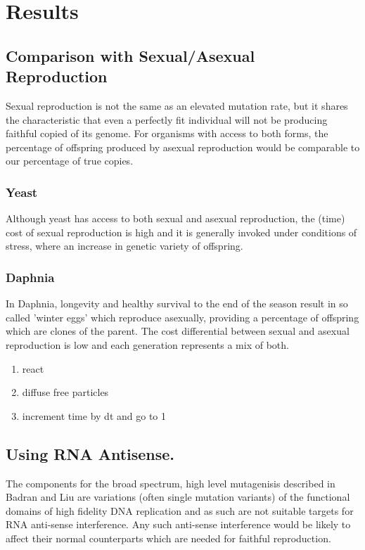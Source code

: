 \documentclass[10pt,letterpaper]{article}
\begin{document}
\section*{Results}

\subsection*{Comparison with Sexual/Asexual Reproduction}
Sexual reproduction is not the same as an elevated mutation rate, but it shares the characteristic that even a perfectly fit individual will not be producing faithful copied of its genome. For organisms with access to both forms, the percentage of offspring produced by asexual reproduction would be comparable to our percentage of true copies.
\subsubsection*{Yeast}
Although yeast has access to both sexual and asexual reproduction, the (time) cost of sexual reproduction is high and it is generally invoked under conditions of stress, where an increase in genetic variety of offspring.
\subsubsection*{Daphnia} 
In Daphnia, longevity and healthy survival to the end of the season result in so called 'winter eggs' which reproduce asexually, providing a percentage of offspring which are clones of the parent. The cost differential between sexual and asexual reproduction is low and each generation represents a mix of both.

\begin{enumerate}
	\item{react}
	\item{diffuse free particles}
	\item{increment time by dt and go to 1}
\end{enumerate}

\subsection*{Using RNA Antisense.}

The components for the broad spectrum, high level mutagenisis described in Badran and Liu\cite{mutation} are variations (often single mutation variants) of the functional domains of high fidelity DNA replication and as such are not suitable targets for RNA anti-sense interference. Any such anti-sense interference would be likely to affect their normal counterparts which are needed for faithful reproduction.
\end{document}
